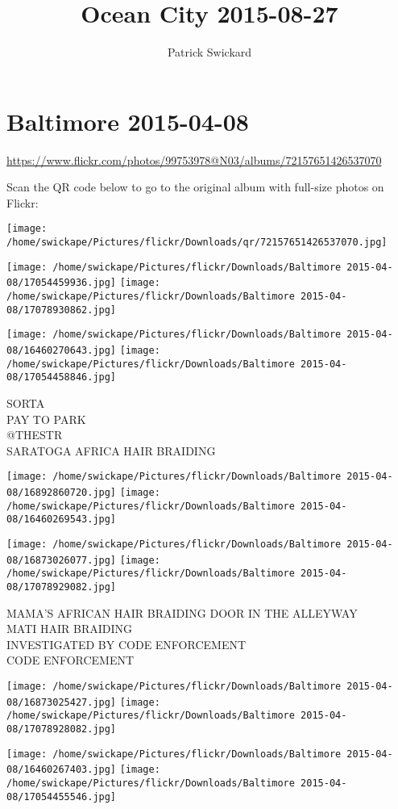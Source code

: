 \documentclass[10pt,letterpaper]{article}
\title{Ocean City 2015-08-27}
\author{Patrick Swickard}
\date{}
\begin{document}
\section*{Baltimore 2015-04-08}

\url{https://www.flickr.com/photos/99753978@N03/albums/72157651426537070}

Scan the QR code below to go to the original album with full-size photos on Flickr:

\texttt{[image: /home/swickape/Pictures/flickr/Downloads/qr/72157651426537070.jpg]}
\pagebreak

\texttt{[image: /home/swickape/Pictures/flickr/Downloads/Baltimore 2015-04-08/17054459936.jpg]}
\texttt{[image: /home/swickape/Pictures/flickr/Downloads/Baltimore 2015-04-08/17078930862.jpg]}

\texttt{[image: /home/swickape/Pictures/flickr/Downloads/Baltimore 2015-04-08/16460270643.jpg]}
\texttt{[image: /home/swickape/Pictures/flickr/Downloads/Baltimore 2015-04-08/17054458846.jpg]}

SORTA\\
PAY TO PARK\\
@THESTR\\
SARATOGA AFRICA HAIR BRAIDING
\pagebreak

\texttt{[image: /home/swickape/Pictures/flickr/Downloads/Baltimore 2015-04-08/16892860720.jpg]}
\texttt{[image: /home/swickape/Pictures/flickr/Downloads/Baltimore 2015-04-08/16460269543.jpg]}

\texttt{[image: /home/swickape/Pictures/flickr/Downloads/Baltimore 2015-04-08/16873026077.jpg]}
\texttt{[image: /home/swickape/Pictures/flickr/Downloads/Baltimore 2015-04-08/17078929082.jpg]}

MAMA'S AFRICAN HAIR BRAIDING DOOR IN THE ALLEYWAY\\
MATI HAIR BRAIDING\\
INVESTIGATED BY CODE ENFORCEMENT\\
CODE ENFORCEMENT
\pagebreak

\texttt{[image: /home/swickape/Pictures/flickr/Downloads/Baltimore 2015-04-08/16873025427.jpg]}
\texttt{[image: /home/swickape/Pictures/flickr/Downloads/Baltimore 2015-04-08/17078928082.jpg]}

\texttt{[image: /home/swickape/Pictures/flickr/Downloads/Baltimore 2015-04-08/16460267403.jpg]}
\texttt{[image: /home/swickape/Pictures/flickr/Downloads/Baltimore 2015-04-08/17054455546.jpg]}
\end{document}
